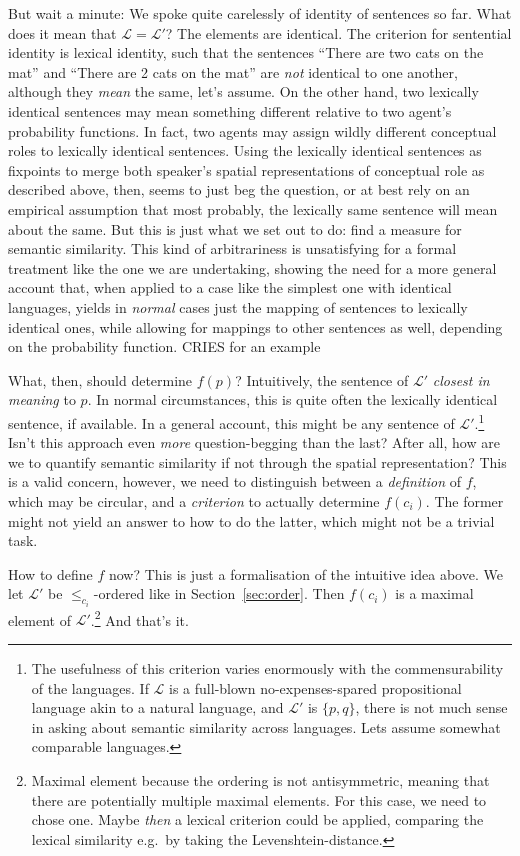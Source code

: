 \documentclass[11pt, a4paper]{scrartcl}
\renewcommand{\i}[1]{\emph{#1}}
\renewcommand{\L}{\mathcal{L}}
\begin{document}
But wait a minute: We spoke quite carelessly of identity of sentences so far. What does it mean that $\L = \L'$? The elements are identical. The criterion for sentential identity is lexical identity, such that the sentences ``There are two cats on the mat'' and ``There are 2 cats on the mat'' are \i{not} identical to one another, although they \i{mean} the same, let's assume. On the other hand, two lexically identical sentences may mean something different relative to two agent's probability functions. In fact, two agents may assign wildly different conceptual roles to lexically identical sentences. Using the lexically identical sentences as fixpoints to merge both speaker's spatial representations of conceptual role as described above, then, seems to just beg the question, or at best rely on an empirical assumption that most probably, the lexically same sentence will mean about the same. But this is just what we set out to do: find a measure for semantic similarity. This kind of arbitrariness is unsatisfying for a formal treatment like the one we are undertaking, showing the need for a more general account that, when applied to a case like the simplest one with identical languages, yields in \i{normal} cases just the mapping of sentences to lexically identical ones, while allowing for mappings to other sentences as well, depending on the probability function.{\color{red} CRIES for an example} 

What, then, should determine $f(p)$? Intuitively, the sentence of $\L'$ \i{closest in meaning} to $p$. In normal circumstances, this is quite often the lexically identical sentence, if available. In a general account, this might be any sentence of $\L'$.\footnote{The usefulness of this criterion varies enormously with the commensurability of the languages. If $\L$ is a full-blown no-expenses-spared propositional language akin to a natural language, and $\L'$ is $\{p, q\}$, there is not much sense in asking about semantic similarity across languages. Lets assume somewhat comparable languages.} Isn't this approach even \i{more} question-begging than the last? After all, how are we to quantify semantic similarity if not through the spatial representation? This is a valid concern, however, we need to distinguish between a \i{definition} of $f$, which may be circular, and a \i{criterion} to actually determine $f(c_i)$. The former might not yield an answer to how to do the latter, which might not be a trivial task.

How to define $f$ now? This is just a formalisation of the intuitive idea above. 
We let $\L'$ be $\leqslant_{c_i}$-ordered like in Section~\ref{sec:order}. Then $f(c_i)$ is a maximal element of $\L'$.\footnote{Maximal element because the ordering is not antisymmetric, meaning that there are potentially multiple maximal elements. For this case, we need to chose one. Maybe \i{then} a lexical criterion could be applied, comparing the lexical similarity e.g.\ by taking the Levenshtein-distance.} And that's it. 
\end{document}
